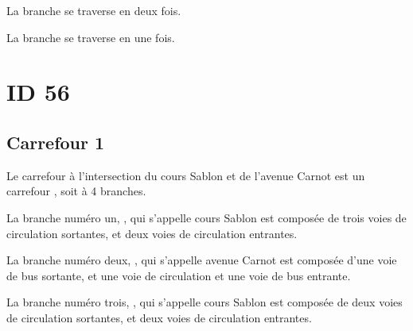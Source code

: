 \begin{appendix}
\newpar{}

 

\newpar{}

La branche  se traverse en deux fois. 

\newpar{}

La branche  se traverse en une fois. 

\newpar{}


\section*{ID 56}

\label{annexe:q_ID56}

\subsection*{Carrefour 1}

\label{annexe:q_ID56_carrefour1}

Le carrefour à l'intersection du cours Sablon et de l'avenue Carnot est un carrefour , soit à 4 branches.

\newpar{}

La branche numéro un, , qui s'appelle cours Sablon est composée de trois voies de circulation sortantes, et deux voies de circulation entrantes.

\newpar{}

La branche numéro deux, , qui s'appelle avenue Carnot est composée d'une voie de bus sortante, et une voie de circulation et une voie de bus entrante.

\newpar{}

La branche numéro trois, , qui s'appelle cours Sablon est composée de deux voies de circulation sortantes, et deux voies de circulation entrantes.


\end{appendix}

